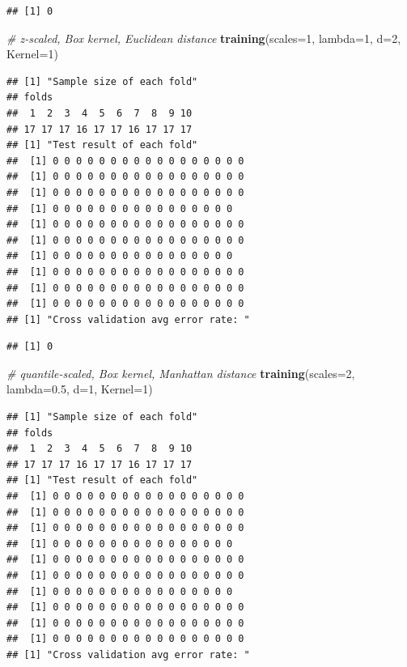 \documentclass[12pt]{article}
\newenvironment{Shaded}{\begin{snugshade}}{\end{snugshade}}
\newcommand{\AttributeTok}[1]{\textcolor[rgb]{0.13,0.29,0.53}{#1}}
\newcommand{\CommentTok}[1]{\textcolor[rgb]{0.56,0.35,0.01}{\textit{#1}}}
\newcommand{\DecValTok}[1]{\textcolor[rgb]{0.00,0.00,0.81}{#1}}
\newcommand{\FloatTok}[1]{\textcolor[rgb]{0.00,0.00,0.81}{#1}}
\newcommand{\FunctionTok}[1]{\textcolor[rgb]{0.13,0.29,0.53}{\textbf{#1}}}
\newcommand{\NormalTok}[1]{#1}
\begin{document}
\begin{verbatim}
## [1] 0
\end{verbatim}

\begin{Shaded}
\begin{Highlighting}[]
\CommentTok{\# z{-}scaled, Box kernel, Euclidean distance}
\FunctionTok{training}\NormalTok{(}\AttributeTok{scales=}\DecValTok{1}\NormalTok{, }\AttributeTok{lambda=}\DecValTok{1}\NormalTok{, }\AttributeTok{d=}\DecValTok{2}\NormalTok{, }\AttributeTok{Kernel=}\DecValTok{1}\NormalTok{)}
\end{Highlighting}
\end{Shaded}

\begin{verbatim}
## [1] "Sample size of each fold"
## folds
##  1  2  3  4  5  6  7  8  9 10 
## 17 17 17 16 17 17 16 17 17 17 
## [1] "Test result of each fold"
##  [1] 0 0 0 0 0 0 0 0 0 0 0 0 0 0 0 0 0
##  [1] 0 0 0 0 0 0 0 0 0 0 0 0 0 0 0 0 0
##  [1] 0 0 0 0 0 0 0 0 0 0 0 0 0 0 0 0 0
##  [1] 0 0 0 0 0 0 0 0 0 0 0 0 0 0 0 0
##  [1] 0 0 0 0 0 0 0 0 0 0 0 0 0 0 0 0 0
##  [1] 0 0 0 0 0 0 0 0 0 0 0 0 0 0 0 0 0
##  [1] 0 0 0 0 0 0 0 0 0 0 0 0 0 0 0 0
##  [1] 0 0 0 0 0 0 0 0 0 0 0 0 0 0 0 0 0
##  [1] 0 0 0 0 0 0 0 0 0 0 0 0 0 0 0 0 0
##  [1] 0 0 0 0 0 0 0 0 0 0 0 0 0 0 0 0 0
## [1] "Cross validation avg error rate: "
\end{verbatim}

\begin{verbatim}
## [1] 0
\end{verbatim}

\begin{Shaded}
\begin{Highlighting}[]
\CommentTok{\# quantile{-}scaled, Box kernel, Manhattan distance}
\FunctionTok{training}\NormalTok{(}\AttributeTok{scales=}\DecValTok{2}\NormalTok{, }\AttributeTok{lambda=}\FloatTok{0.5}\NormalTok{, }\AttributeTok{d=}\DecValTok{1}\NormalTok{, }\AttributeTok{Kernel=}\DecValTok{1}\NormalTok{)}
\end{Highlighting}
\end{Shaded}

\begin{verbatim}
## [1] "Sample size of each fold"
## folds
##  1  2  3  4  5  6  7  8  9 10 
## 17 17 17 16 17 17 16 17 17 17 
## [1] "Test result of each fold"
##  [1] 0 0 0 0 0 0 0 0 0 0 0 0 0 0 0 0 0
##  [1] 0 0 0 0 0 0 0 0 0 0 0 0 0 0 0 0 0
##  [1] 0 0 0 0 0 0 0 0 0 0 0 0 0 0 0 0 0
##  [1] 0 0 0 0 0 0 0 0 0 0 0 0 0 0 0 0
##  [1] 0 0 0 0 0 0 0 0 0 0 0 0 0 0 0 0 0
##  [1] 0 0 0 0 0 0 0 0 0 0 0 0 0 0 0 0 0
##  [1] 0 0 0 0 0 0 0 0 0 0 0 0 0 0 0 0
##  [1] 0 0 0 0 0 0 0 0 0 0 0 0 0 0 0 0 0
##  [1] 0 0 0 0 0 0 0 0 0 0 0 0 0 0 0 0 0
##  [1] 0 0 0 0 0 0 0 0 0 0 0 0 0 0 0 0 0
## [1] "Cross validation avg error rate: "
\end{verbatim}
\end{document}
